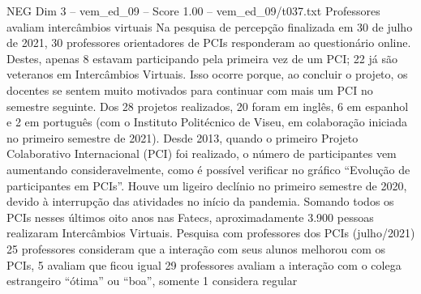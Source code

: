 \begin{textsample}{NEG Dim 3 – vem\_ed\_09 – Score 1.00 – vem\_ed\_09/t037.txt}  \label{ex:f3_neg_031}
Professores avaliam intercâmbios virtuais Na pesquisa de percepção finalizada em 30 de julho de 2021, 30 professores orientadores de PCIs responderam ao questionário online.
Destes, apenas 8 estavam participando pela primeira vez de um PCI; 22 já são veteranos em Intercâmbios Virtuais.
Isso ocorre porque, ao concluir o projeto, os docentes se sentem muito motivados para continuar com mais um PCI no semestre seguinte.
Dos 28 projetos realizados, 20 foram em inglês, 6 em espanhol e 2 em português (com o Instituto Politécnico de Viseu, em colaboração iniciada no primeiro semestre de 2021).
Desde 2013, quando o primeiro Projeto Colaborativo Internacional (PCI) foi realizado, o número de participantes vem aumentando consideravelmente, como é possível verificar no gráfico “Evolução de participantes em PCIs”.
Houve um ligeiro declínio no primeiro semestre de 2020, devido à interrupção das atividades no início da pandemia.
Somando todos os PCIs nesses últimos oito anos nas Fatecs, aproximadamente 3.900 pessoas realizaram Intercâmbios Virtuais.
Pesquisa com professores dos PCIs (julho/2021) 25 professores consideram que a interação com seus alunos melhorou com os PCIs, 5 avaliam que ficou igual 29 professores avaliam a interação com o colega estrangeiro “ótima” ou “boa”, somente 1 considera regular

\end{textsample}
